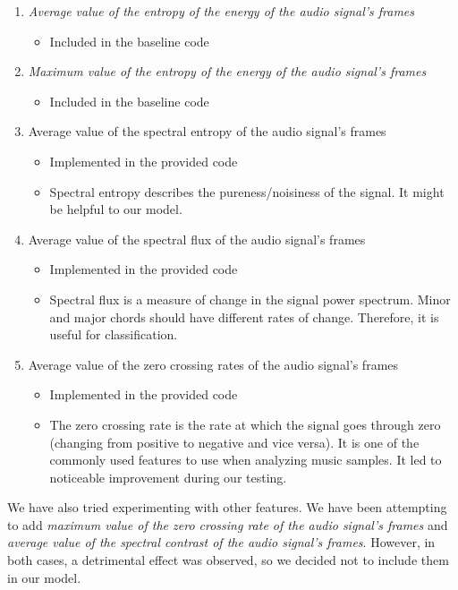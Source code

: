 \documentclass{article}
\begin{document}
\begin{enumerate}
\item \textit{Average value of the entropy of the energy of the audio signal’s frames}
\begin{itemize}
\item Included in the baseline code
\end{itemize}
\item \textit{Maximum value of the entropy of the energy of the audio signal’s frames}
\begin{itemize}
\item Included in the baseline code
\end{itemize}
\item Average value of the spectral entropy of the audio signal’s frames
\begin{itemize}
\item Implemented in the provided code
\item Spectral entropy describes the pureness/noisiness of the signal. It might be helpful to our model.
\end{itemize}
\item Average value of the spectral flux of the audio signal’s frames
\begin{itemize}
\item Implemented in the provided code
\item Spectral flux is a measure of change in the signal power spectrum. Minor and major chords should have different rates of change. Therefore, it is useful for classification.
\end{itemize}
\item Average value of the zero crossing rates of the audio signal’s frames
\begin{itemize}
\item Implemented in the provided code
\item The zero crossing rate is the rate at which the signal goes through zero (changing from positive to negative and vice versa). It is one of the commonly used features to use when analyzing music samples. It led to noticeable improvement during our testing.
\end{itemize}


\end{enumerate}

We have also tried experimenting with other features. We have been attempting to add \textit{maximum value of the zero crossing rate of the audio signal’s frames} and \textit{average value of the spectral contrast of the audio signal’s frames}. However, in both cases, a detrimental effect was observed, so we decided not to include them in our model.
\end{document}
